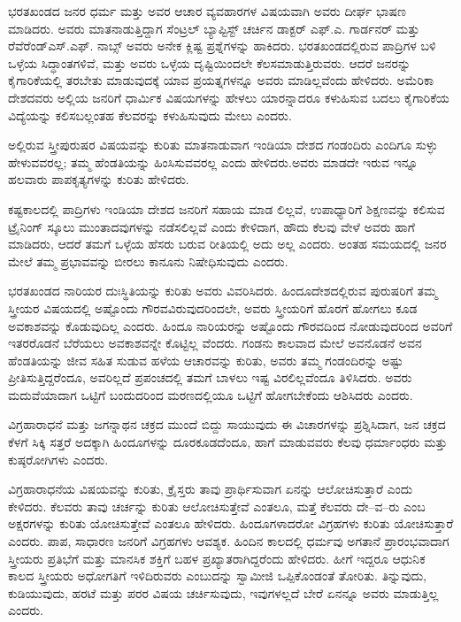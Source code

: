 ಭರತಖಂಡದ ಜನರ ಧರ್ಮ ಮತ್ತು ಅವರ ಆಚಾರ ವ್ಯವಹಾರಗಳ ವಿಷಯವಾಗಿ ಅವರು ದೀರ್ಘ ಭಾಷಣ ಮಾಡಿದರು. ಅವರು ಮಾತನಾಡುತ್ತಿದ್ದಾಗ ಸೆಂಟ್ರಲ್​ ಬ್ಯಾಪ್ಟಿಸ್ಟ್​ ಚರ್ಚಿನ ಡಾಕ್ಟರ್​ ಎಫ್​.ಎ. ಗಾರ್ಡನರ್​ ಮತ್ತು ರೆವೆರೆಂಡ್​ ಎಸ್​.ಎಫ್​. ನಾಬ್ಸ್​ ಅವರು ಅನೇಕ ಕ್ಲಿಷ್ಟ ಪ್ರಶ್ನೆಗಳನ್ನು ಹಾಕಿದರು. ಭರತಖಂಡದಲ್ಲಿರುವ ಪಾದ್ರಿಗಳ ಬಳಿ ಒಳ್ಳೆಯ ಸಿದ್ಧಾಂತಗಳಿವೆ, ಮತ್ತು ಅವರು ಒಳ್ಳೆಯ ದೃಷ್ಟಿಯಿಂದಲೇ ಕೆಲಸಮಾಡುತ್ತಿರುವರು. ಆದರೆ ಜನರನ್ನು ಕೈಗಾರಿಕೆಯಲ್ಲಿ ತರಬೇತು ಮಾಡುವುದಕ್ಕೆ ಯಾವ ಪ್ರಯತ್ನಗಳನ್ನೂ ಅವರು ಮಾಡಿಲ್ಲವೆಂದು ಹೇಳಿದರು. ಅಮೆರಿಕಾ ದೇಶದವರು ಅಲ್ಲಿಯ ಜನರಿಗೆ ಧಾರ್ಮಿಕ ವಿಷಯಗಳನ್ನು ಹೇಳಲು ಯಾರನ್ನಾದರೂ ಕಳುಹಿಸುವ ಬದಲು ಕೈಗಾರಿಕೆಯ ವಿದ್ಯೆಯನ್ನು ಕಲಿಸಬಲ್ಲಂತಹ ಕೆಲವರನ್ನು ಕಳುಹಿಸುವುದು ಮೇಲು ಎಂದರು.

ಅಲ್ಲಿರುವ ಸ್ತ್ರೀಪುರುಷರ ವಿಷಯವನ್ನು ಕುರಿತು ಮಾತನಾಡುವಾಗ ಇಂಡಿಯಾ ದೇಶದ ಗಂಡಂದಿರು ಎಂದಿಗೂ ಸುಳ್ಳು ಹೇಳುವವರಲ್ಲ; ತಮ್ಮ ಹೆಂಡತಿಯನ್ನು ಹಿಂಸಿಸುವವರಲ್ಲ ಎಂದು ಹೇಳಿದರು.ಅವರು ಮಾಡದೇ ಇರುವ ಇನ್ನೂ ಹಲವಾರು ಪಾಪಕೃತ್ಯಗಳನ್ನು ಕುರಿತು ಹೇಳಿದರು.

ಕಷ್ಟಕಾಲದಲ್ಲಿ ಪಾದ್ರಿಗಳು ಇಂಡಿಯಾ ದೇಶದ ಜನರಿಗೆ ಸಹಾಯ ಮಾಡ ಲಿಲ್ಲವೆ, ಉಪಾಧ್ಯಾರಿಗೆ ಶಿಕ್ಷಣವನ್ನು ಕಲಿಸುವ ಟ್ರೈನಿಂಗ್​ ಸ್ಕೂಲು ಮುಂತಾದವುಗಳನ್ನು ನಡೆಸಲಿಲ್ಲವೆ ಎಂದು ಕೇಳಿದಾಗ, ಹೌದು ಕೆಲವು ವೇಳೆ ಅವರು ಹಾಗೆ ಮಾಡಿದರು, ಆದರೆ ತಮಗೆ ಒಳ್ಳೆಯ ಹೆಸರು ಬರುವ ರೀತಿಯಲ್ಲಿ ಅದು ಅಲ್ಲ ಎಂದರು. ಅಂತಹ ಸಮಯದಲ್ಲಿ ಜನರ ಮೇಲೆ ತಮ್ಮ ಪ್ರಭಾವವನ್ನು ಬೀರಲು ಕಾನೂನು ನಿಷೇಧಿಸುವುದು ಎಂದರು.

ಭರತಖಂಡದ ನಾರಿಯರ ದುಃಸ್ಥಿತಿಯನ್ನು ಕುರಿತು ಅವರು ವಿವರಿಸಿದರು. ಹಿಂದೂದೇಶದಲ್ಲಿರುವ ಪುರುಷರಿಗೆ ತಮ್ಮ ಸ್ತ್ರೀಯರ ವಿಷಯದಲ್ಲಿ ಅಷ್ಟೊಂದು ಗೌರವವಿರುವುದರಿಂದಲೇ, ಅವರು ಸ್ತ್ರೀಯರಿಗೆ ಹೊರಗೆ ಹೋಗಲು ಕೂಡ ಅವಕಾಶವನ್ನು ಕೊಡುವುದಿಲ್ಲ ಎಂದರು. ಹಿಂದೂ ನಾರಿಯರನ್ನು ಅಷ್ಟೊಂದು ಗೌರವದಿಂದ ನೋಡುವುದರಿಂದ ಅವರಿಗೆ ಇತರರೊಡನೆ ಬೆರೆಯಲು ಅವಕಾಶವನ್ನೇ ಕೊಟ್ಟಿಲ್ಲ ವೆಂದರು. ಗಂಡನು ಕಾಲವಾದ ಮೇಲೆ ಅವನೊಡನೆ ಅವನ ಹೆಂಡತಿಯನ್ನು ಜೀವ ಸಹಿತ ಸುಡುವ ಹಳೆಯ ಆಚಾರವನ್ನು ಕುರಿತು, ಅವರು ತಮ್ಮ ಗಂಡಂದಿರನ್ನು ಅಷ್ಟು ಪ್ರೀತಿಸುತ್ತಿದ್ದರೆಂದೂ, ಅವರಿಲ್ಲದೆ ಪ್ರಪಂಚದಲ್ಲಿ ತಮಗೆ ಬಾಳಲು ಇಷ್ಟ ವಿರಲಿಲ್ಲವೆಂದೂ ತಿಳಿಸಿದರು. ಅವರು ಮದುವೆಯಾದಾಗ ಒಟ್ಟಿಗೆ ಬಂದುದರಿಂದ ಮರಣದಲ್ಲಿಯೂ ಒಟ್ಟಿಗೆ ಹೋಗಬೇಕೆಂದು ಆಶಿಸಿದರು ಎಂದರು.

ವಿಗ್ರಹಾರಾಧನೆ ಮತ್ತು ಜಗನ್ನಾಥನ ಚಕ್ರದ ಮುಂದೆ ಬಿದ್ದು ಸಾಯುವುದು ಈ ವಿಚಾರಗಳನ್ನು ಪ್ರಶ್ನಿಸಿದಾಗ, ಜನ ಚಕ್ರದ ಕೆಳಗೆ ಸಿಕ್ಕಿ ಸತ್ತರೆ ಅದಕ್ಕಾಗಿ ಹಿಂದೂಗಳನ್ನು ದೂರಕೂಡದೆಂದೂ, ಹಾಗೆ ಮಾಡುವವರು ಕೆಲವು ಧರ್ಮಾಂಧರು ಮತ್ತು ಕುಷ್ಠರೋಗಿಗಳು ಎಂದರು.

ವಿಗ್ರಹಾರಾಧನೆಯ ವಿಷಯವನ್ನು ಕುರಿತು, ಕ್ರೈಸ್ತರು ತಾವು ಪ್ರಾರ್ಥಿಸುವಾಗ ಏನನ್ನು ಆಲೋಚಿಸುತ್ತಾರೆ ಎಂದು ಕೇಳಿದರು. ಕೆಲವರು ತಾವು ಚರ್ಚನ್ನು ಕುರಿತು ಆಲೋಚಿಸುತ್ತೇವೆ ಎಂತಲೂ, ಮತ್ತೆ ಕೆಲವರು ದೇ–ವ–ರು ಎಂಬ ಅಕ್ಷರಗಳನ್ನು ಕುರಿತು ಯೋಚಿಸುತ್ತೇವೆ ಎಂತಲೂ ಹೇಳಿದರು. ಹಿಂದೂಗಳಾದರೋ ವಿಗ್ರಹಗಳು ಕುರಿತು ಯೋಚಿಸುತ್ತಾರೆ ಎಂದರು. ಪಾಪ, ಸಾಧಾರಣ ಜನರಿಗೆ ವಿಗ್ರಹಗಳು ಆವಶ್ಯಕ. ಹಿಂದಿನ ಕಾಲದಲ್ಲಿ ಧರ್ಮವು ಅಗತಾನೆ ಪ್ರಾರಂಭವಾದಾಗ ಸ್ತ್ರೀಯರು ಪ್ರತಿಭೆಗೆ ಮತ್ತು ಮಾನಸಿಕ ಶಕ್ತಿಗೆ ಬಹಳ ಪ್ರಖ್ಯಾತರಾಗಿದ್ದರೆಂದು ಹೇಳಿದರು. ಹೀಗೆ ಇದ್ದರೂ ಆಧುನಿಕ ಕಾಲದ ಸ್ತ್ರೀಯರು ಅಧೋಗತಿಗೆ ಇಳಿದಿರುವರು ಎಂಬುದನ್ನು ಸ್ವಾಮೀಜಿ ಒಪ್ಪಿಕೊಂಡಂತೆ ತೋರಿತು. ತಿನ್ನುವುದು, ಕುಡಿಯುವುದು, ಹರಟೆ ಮತ್ತು ಪರರ ವಿಷಯ ಚರ್ಚಿಸುವುದು, ಇವುಗಳಲ್ಲದೆ ಬೇರೆ ಏನನ್ನೂ ಅವರು ಮಾಡುತ್ತಿಲ್ಲ ಎಂದರು.

